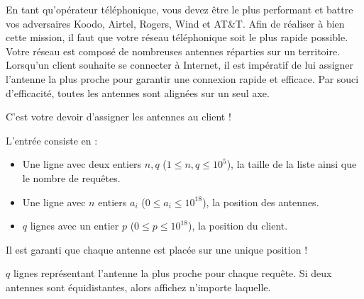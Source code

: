 \problemname{}


En tant qu'opérateur téléphonique, vous devez être le plus performant et battre vos adversaires Koodo, Airtel, Rogers, Wind et AT\&T. Afin de réaliser à bien cette mission, il faut que votre réseau téléphonique soit le plus rapide possible. Votre réseau est composé de nombreuses antennes réparties sur un territoire. Lorsqu'un client souhaite se connecter à Internet, il est impératif de lui assigner l'antenne la plus proche pour garantir une connexion rapide et efficace. Par souci d'efficacité, toutes les antennes sont alignées sur un seul axe.

C'est votre devoir d'assigner les antennes au client !

\begin{Input}
    L'entrée consiste en :
    \begin{itemize}
        \item Une ligne avec deux entiers $n, q$ ($1 \leq n, q \leq 10^5$), la taille de la liste ainsi que le nombre de requêtes.
        \item Une ligne avec $n$ entiers $a_i$ ($0 \leq a_i \leq 10^{18}$), la position des antennes.
        \item $q$ lignes avec un entier $p$ ($0 \leq p \leq 10^{18}$), la position du client.
    \end{itemize}
    Il est garanti que chaque antenne est placée sur une unique position !
\end{Input}

\begin{Output}
    $q$ lignes représentant l'antenne la plus proche pour chaque requête. Si deux antennes sont équidistantes, alors affichez n'importe laquelle.
\end{Output}
